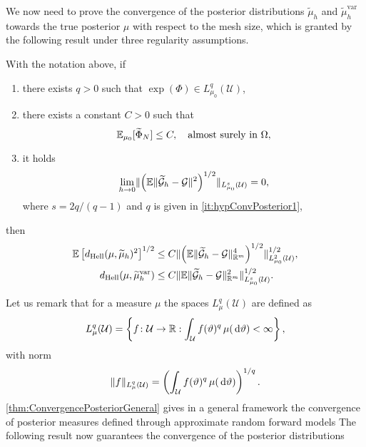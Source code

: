 We now need to prove the convergence of the posterior distributions $\tilde \mu_h$ and $\tilde \mu_h^{\mathrm{var}}$ towards the true posterior $\mu$ with respect to the mesh size, which is granted by the following result under three regularity assumptions.
\begin{theorem}\label{thm:ConvergencePosteriorGeneral} With the notation above, if
	\begin{enumerate}
		\item\label{it:hypConvPosterior1} there exists $q > 0$ such that $\exp(\Phi) \in L_{\mu_0}^q(\mathcal U)$,
		\item\label{it:hypConvPosterior2} there exists a constant $C > 0$ such that
		\begin{equation}
			\operatorname{\mathbb{E}}_{\mu_0} [\widetilde \Phi_N] \leq C, \quad \text{almost surely in } \Omega,
		\end{equation}
		\item\label{it:hypConvPosterior3} it holds
		\begin{equation}
			\lim_{h \to 0} \lVert\left(\operatorname{\mathbb{E}}\lVert\widetilde{\mathcal G}_h - \mathcal G\rVert^2\right)^{1/2}\rVert_{L^s_{\mu_0}(\mathcal U)} = 0,
		\end{equation}
		where $s = 2q / (q-1)$ and $q$ is given in \ref{it:hypConvPosterior1},
	\end{enumerate}
	then 
	\begin{equation}
	\begin{aligned}
		\operatorname{\mathbb{E}}\left[d_{\mathrm{Hell}}(\mu, \widetilde \mu_h)^2\right]^{1/2} &\leq C \lVert\left(\operatorname{\mathbb{E}}\lVert\widetilde{\mathcal G}_h - \mathcal G\rVert_{\mathbb{R}^m}^4\right)^{1/2}\rVert^{1/2}_{L_{\mu_0}^2(\mathcal U)}, \\
		d_{\mathrm{Hell}}(\mu, \widetilde \mu_h^{\mathrm{var}}) &\leq C \lVert\operatorname{\mathbb{E}}\lVert\widetilde{\mathcal G}_h - \mathcal G\rVert_{\mathbb{R}^m}^2\rVert^{1/2}_{L_{\mu_0}^s(\mathcal U)}. 
	\end{aligned}
	\end{equation}
\end{theorem}
Let us remark that for a measure $\mu$ the spaces $L_{\mu}^q(\mathcal U)$ are defined as
\begin{equation}
	L_{\mu}^q(\mathcal U) = \left\{f \colon \mathcal U \to \mathbb{R} : \int_{\mathcal U} f(\vartheta)^q \, \mu(\,\mathrm{d} \vartheta) < \infty \right\},
\end{equation}
with norm 
\begin{equation}
	\lVert f\rVert_{L_{\mu}^q(\mathcal U)} = \left(\int_{\mathcal U} f(\vartheta)^q \, \mu(\,\mathrm{d} \vartheta) \right)^{1/q}.
\end{equation}
\cref{thm:ConvergencePosteriorGeneral} gives in a general framework the convergence of posterior measures defined through approximate random forward models  
The following result now guarantees the convergence of the posterior distributions


